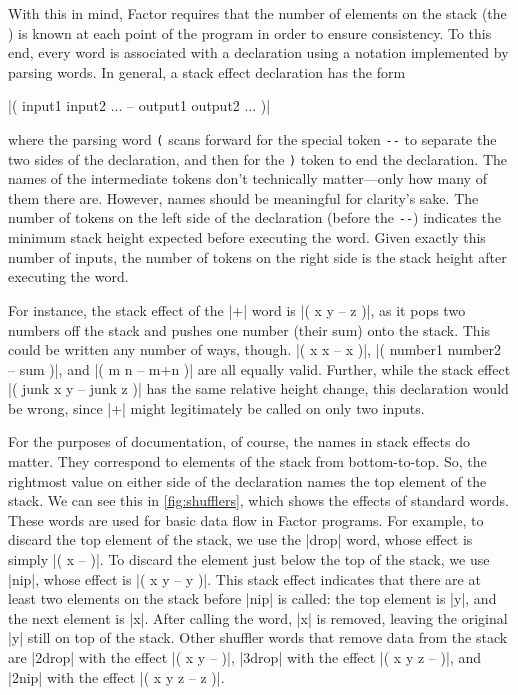 With this in mind, Factor requires that the number of elements on the stack
(the ) is known at each point of the program in order to
ensure consistency.  To this end, every word is associated with a  declaration using a notation implemented by parsing words.  In general,
a stack effect declaration has the form
%
\begin{center}
  \factor|( input1 input2 ... -- output1 output2 ... )|
\end{center}
%
where the parsing word \Verb|(| scans forward for the special token \Verb|--|
to separate the two sides of the declaration, and then for the \Verb|)| token
to end the declaration.  The names of the intermediate tokens don't technically
matter---only how many of them there are.  However, names should be meaningful
for clarity's sake.  The number of tokens on the left side of the declaration
(before the \Verb|--|) indicates the minimum stack height expected before
executing the word.  Given exactly this number of inputs, the number of tokens
on the right side is the stack height after executing the word.

For instance, the stack effect of the \factor|+| word is
%
\factor|( x y -- z )|,
%
as it pops two numbers off the stack and pushes one number (their sum) onto the
stack.  This could be written any number of ways, though.
%
\factor|( x x -- x )|,
%
\factor|( number1 number2 -- sum )|,
%
and
%
\factor|( m n -- m+n )|
%
are all equally valid.  Further, while the stack effect
%
\factor|( junk x y -- junk z )|
%
has the same relative height change, this declaration would be wrong, since
\factor|+| might legitimately be called on only two inputs.


For the purposes of documentation, of course, the names in stack effects do
matter.  They correspond to elements of the stack from bottom-to-top.  So, the
rightmost value on either side of the declaration names the top element of the
stack.  We can see this in \cref{fig:shufflers}, which shows the effects of
standard  words.  These words are used for basic data flow
in Factor programs.  For example, to discard the top element of the stack, we
use the \factor|drop| word, whose effect is simply
%
\factor|( x -- )|.
%
To discard the element just below the top of the stack, we use \factor|nip|,
whose effect is
%
\factor|( x y -- y )|.
%
This stack effect indicates that there are at least two elements on the stack
before \factor|nip| is called: the top element is \factor|y|, and the next
element is \factor|x|.  After calling the word, \factor|x| is removed, leaving
the original \factor|y| still on top of the stack.  Other shuffler words that
remove data from the stack are
%
\factor|2drop| with the effect \factor|( x y -- )|,
%
\factor|3drop| with the effect \factor|( x y z -- )|, and
%
\factor|2nip| with the effect \factor|( x y z -- z )|.

